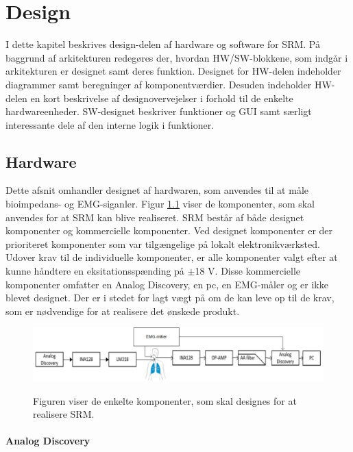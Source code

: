 \chapter{Design}

I dette kapitel beskrives design-delen af hardware og software for SRM. På baggrund af arkitekturen redegøres der, hvordan HW/SW-blokkene, som indgår i arkitekturen er designet samt deres funktion. Designet for HW-delen indeholder diagrammer samt beregninger af komponentværdier. Desuden indeholder HW-delen en kort
beskrivelse af designovervejelser i forhold til de enkelte hardwareenheder. SW-designet beskriver funktioner og GUI samt særligt interessante dele af den interne logik i funktioner. 


\section{Hardware}

Dette afsnit omhandler designet af hardwaren, som anvendes til at måle  bioimpedans- og EMG-siganler. Figur \ref{fig:Blokaede} viser de komponenter, som skal anvendes for at SRM kan blive realiseret. SRM består af både designet komponenter og kommercielle komponenter. Ved designet komponenter er der prioriteret komponenter som var tilgængelige på lokalt elektronikværksted. Udover krav til de individuelle komponenter, er alle komponenter valgt efter at kunne håndtere en eksitationsspænding på $\pm$18 V. Disse kommercielle komponenter omfatter en Analog Discovery, en pc, en EMG-måler og er ikke blevet designet. Der er i stedet for lagt vægt på om de kan leve op til de krav, som er nødvendige for at realisere det ønskede produkt.


\begin{figure}[H]
\centering
{\includegraphics[width=\textwidth]
{Figure/Blokaede}}
\caption{Figuren viser de enkelte komponenter, som skal designes for at realisere SRM.}
\label{fig:Blokaede}
\end{figure}

\subsubsection{Analog Discovery}

